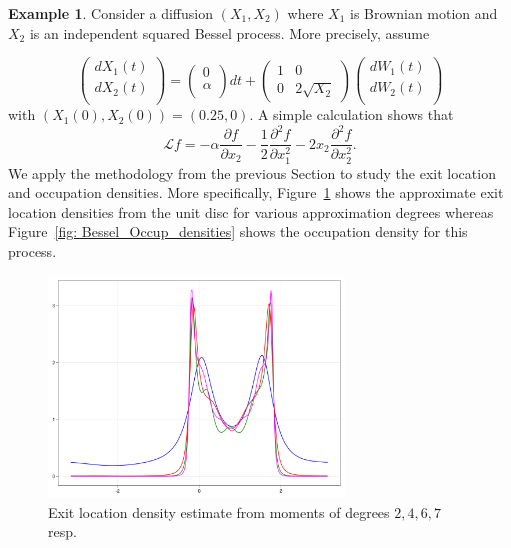 \documentclass[12pt]{amsart}
\theoremstyle{definition}
\newtheorem{examplex}[lemma]{Example}
\begin{document}
\begin{examplex} Consider a diffusion $(X_1,X_2)$ where $X_1$ is Brownian motion and $X_2$ is an independent squared Bessel process. More precisely, assume

\[
\left(\begin{array}{c}
dX_1(t)\\
dX_2(t)\\
\end{array}\right)
=
\left(\begin{array}{c}
0\\
\alpha\\
\end{array}\right)dt + 
\left(\begin{array}{cc}
1 & 0 \\
0 & 2\sqrt{X_2}
\end{array}\right)
\left(\begin{array}{c}
dW_1(t)\\
dW_2(t)\\
\end{array}\right)
\]
with $(X_1(0),X_2(0)) = (0.25,0)$. A simple calculation shows that
\[\mathcal{L}f=-\alpha \frac{\partial f}{\partial x_2}-\frac{1}{2}\frac{\partial^2 f}{\partial x_1^2}-2x_2\frac{\partial^2 f}{\partial x_2^2}.\] We apply the methodology from the previous Section to study the exit location and occupation densities. More specifically, Figure~\ref{fig: Bessel_loc_densities} shows the approximate exit location densities from the unit disc for various approximation degrees whereas Figure~\ref{fig: Bessel_Occup_densities} shows the occupation density for this process. 

\begin{figure}
    \centering
    \includegraphics[width=0.70\textwidth]{CD_approx_example_3.png}
    \caption{Exit location density estimate from moments of degrees $2,4,6,7$ resp.}
    \label{fig: Bessel_loc_densities}
\end{figure}



\end{examplex}
\end{document}
